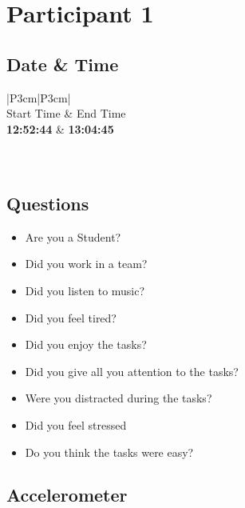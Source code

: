 \section{Participant 1}


\subsection{Date \& Time}
\begin{table}[ht]
  \begin{tabular}{|P{3cm}|P{3cm}|}
	    	\\ \hline
    Start Time      			& End Time   					\\ \hline
   \textbf{12:52:44} 	& \textbf{13:04:45}    	\\ \hline
       						\\ \hline
    			\\ \hline
  \end{tabular}
  \newline\newline
 \caption{P1: Date and Time}\label{dandt1}
\end{table}

\subsection{Questions}
\begin{itemize} 
  \item[\Checkmark] Are you a Student?
  \item[\XSolidBrush] Did you work in a team?
  \item[\Checkmark] Did you listen to music?
  \item[\XSolidBrush] Did you feel tired?
  \item[\Checkmark] Did you enjoy the tasks?
  \item[\Checkmark] Did you give all you attention to the tasks?
  \item[\XSolidBrush] Were you distracted during the tasks?
  \item[\XSolidBrush] Did you feel stressed
  \item[\XSolidBrush] Do you think the tasks were easy?  
\end{itemize}


\FloatBarrier
\newpage
\subsection{Accelerometer}

